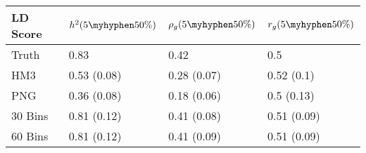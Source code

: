 \begin{table}[ht]
\centering
\begin{tabular}{llll}
  \hline
LD Score & $h^2(5\myhyphen50\%)$ & $\rho_g(5\myhyphen50\%)$ & $r_g(5\myhyphen50\%)$ \\ 
  \hline
Truth & 0.83 & 0.42 & 0.5 \\ 
  HM3 & 0.53 (0.08) & 0.28 (0.07) & 0.52 (0.1) \\ 
  PNG & 0.36 (0.08) & 0.18 (0.06) & 0.5 (0.13) \\ 
  30 Bins & 0.81 (0.12) & 0.41 (0.08) & 0.51 (0.09) \\ 
  60 Bins & 0.81 (0.12) & 0.41 (0.09) & 0.51 (0.09) \\ 
   \hline
\end{tabular}
\end{table}
